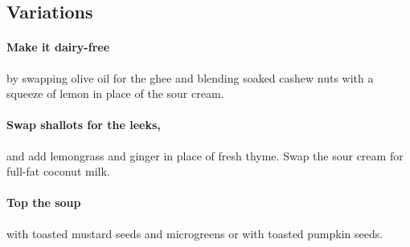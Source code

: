 \subsection{ Variations }
\paragraph{Make it dairy-free} by swapping olive oil for the ghee and blending soaked cashew nuts with a squeeze of lemon in place of the sour cream. 
\paragraph{Swap shallots for the leeks,} and add lemongrass and ginger in place of fresh thyme. Swap the sour cream for full-fat coconut milk. 
\paragraph{Top the soup} with toasted mustard seeds and microgreens or with toasted pumpkin seeds. 


